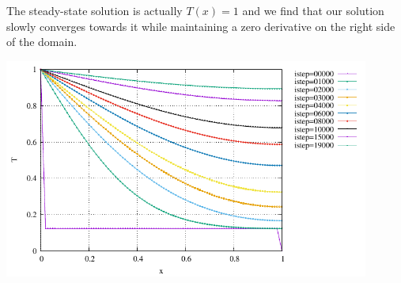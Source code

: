 The steady-state solution is actually $T(x)=1$ and we find that our solution slowly converges towards it
while maintaining a zero derivative on the right side of the domain.
\begin{center}
\includegraphics[width=12cm]{python_codes/fieldstone_157/results/option2/T.pdf}
\end{center}






 
